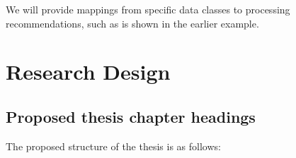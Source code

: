 \documentclass[a4paper,11pt]{article}
\begin{document}
We will provide mappings from specific data classes to processing recommendations, such as is shown in the earlier example.



\section{Research Design} %
\label{sec:research_design}

\subsection{Proposed thesis chapter headings} %
\label{sub:proposed_thesis_chapter_headings}

The proposed structure of the thesis is as follows:
\end{document}
